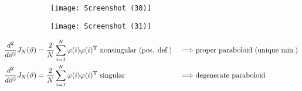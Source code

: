 \begin{figure}
\centering
\begin{subfigure}{.5\textwidth}
  \centering
  \texttt{[image: Screenshot (30)]}
  \label{fig:test1}
\end{subfigure}%
\begin{subfigure}{.5\textwidth}
  \centering
  \texttt{[image: Screenshot (31)]}
  \label{fig:test2}
\end{subfigure}
\end{figure}


\begin{align*}
\frac{d^{2}}{d\theta ^{2}} J_{N}(\theta) & =\frac{2}{N}\sum _{i=1}^{N} \varphi (i) \varphi (i)\transpose \ \text{nonsingular} \ \text{(pos. def.)} & \Longrightarrow \ & \text{proper paraboloid (unique min.)}\\
\frac{d^{2}}{d\theta ^{2}} J_{N}(\theta) & =\frac{2}{N}\sum _{i=1}^{N} \varphi (i) \varphi (i)\transpose\text{ singular} & \ \Longrightarrow \ & \text{degenerate paraboloid}
\end{align*}

